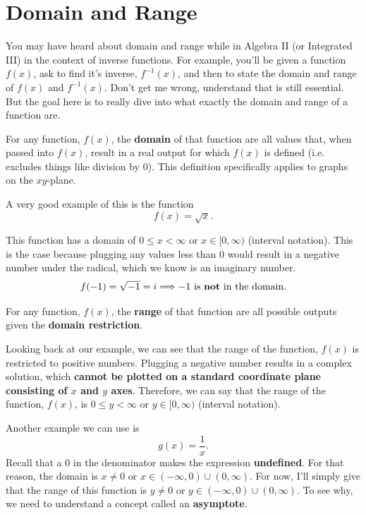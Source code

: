 \chapter{Domain and Range}
You may have heard about domain and range while in Algebra II (or Integrated III) in the context of inverse functions. For example, you'll be given a function $f(x)$, ask to find it's inverse, $f^{-1}(x)$, and then to state the domain and range of $f(x)$ and $f^{-1}(x)$. Don't get me wrong, understand that is still essential. But the goal here is to really dive into what exactly the domain and range of a function are.

\begin{definition}
    For any function, $f(x)$, the \textbf{domain} of that function are all values that, when passed into $f(x)$, result in a real output for which $f(x)$ is defined (i.e. excludes things like division by $0$). This definition specifically applies to graphs on the $xy$-plane.
\end{definition}

A very good example of this is the function
\[
f(x) = \sqrt{x} \text{.}
\]

This function has a domain of $0 \le x < \infty$ or $x \in [0, \infty)$ (interval notation). This is the case because plugging any values less than $0$ would result in a negative number under the radical, which we know is an imaginary number.
\[
f(-1) = \sqrt{-1} = i \Longrightarrow \text{$-1$ is \textbf{not} in the domain.}
\]

\begin{definition}
    For any function, $f(x)$, the \textbf{range} of that function are all possible outputs given the \textbf{domain restriction}.
\end{definition}
Looking back at our example, we can see that the range of the function, $f(x)$ is restricted to positive numbers. Plugging a negative number results in a complex solution, which \textbf{cannot be plotted on a standard coordinate plane consisting of $x$ and $y$ axes}. Therefore, we can say that the range of the function, $f(x)$, is $0 \le y < \infty$ or $y \in [0, \infty)$ (interval notation).

Another example we can use is
\[
g(x) = \frac{1}{x} \text{.}
\]
Recall that a $0$ in the denominator makes the expression \textbf{undefined}. For that reason, the domain is $x \neq 0$ or $x \in (-\infty, 0) \cup (0, \infty)$. For now, I'll simply give that the range of this function is $y \neq 0$ or $y \in (-\infty, 0) \cup (0, \infty)$. To see why, we need to understand a concept called an \textbf{asymptote}.

